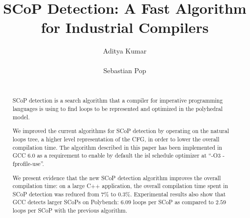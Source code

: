 \documentclass{sig-alternate}
\begin{document}
\def \SCoP {SCoP}
\def \GCC {GCC}
\def \LLVM {LLVM}
\def \SESE {SESE}
\def \CFG {CFG}
\def \SSA {SSA}
\def \scev {scev}

\setlength{\pdfpageheight}{\paperheight}
\setlength{\pdfpagewidth}{\paperwidth}

\title{\SCoP{} Detection: A Fast Algorithm for Industrial Compilers}


\author{
\alignauthor
Aditya Kumar\\
       \\
\alignauthor
Sebastian Pop\\
       \\
}

\maketitle

\begin{abstract}
\SCoP{} detection is a search algorithm that a compiler for imperative programming
languages is using to find loops to be represented and optimized in the
polyhedral model.

We improved the current algorithms for \SCoP{} detection by operating on the
natural loops tree, a higher level representation of the \CFG{,} in order to lower
the overall compilation time.  The algorithm described in this paper has been
implemented in \GCC{} 6.0 as a requirement to enable by default the isl schedule
optimizer at ``-O3 -fprofile-use''.

We present evidence that the new \SCoP{} detection algorithm improves the overall
compilation time: on a large C++ application, the overall compilation time spent
in \SCoP{} detection was reduced from $7\%$ to $0.3\%$.  Experimental results also
show that \GCC{} detects larger \SCoP{s} on Polybench: $6.09$ loops per \SCoP{} as
compared to $2.59$ loops per \SCoP{} with the previous algorithm.
\end{abstract}
\end{document}
